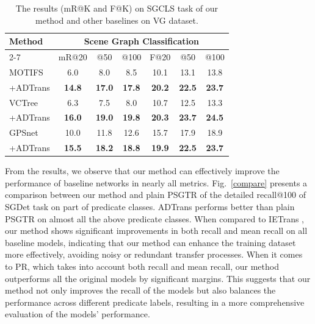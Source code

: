 \documentclass[letterpaper]{article} %
\begin{document}
\begin{table}[]
\tabcolsep=0.1cm

\begin{tabular}{l|cccccc}
\hline
\multirow{2}{*}{Method} & \multicolumn{6}{c}{Scene Graph Classification}                                                                     \\ \cline{2-7} 
                        & mR@20         & @50         & \multicolumn{1}{c|}{@100}        & F@20          & @50          & @100         \\ \hline
MOTIFS                  & 6.0           & 8.0           & \multicolumn{1}{c|}{8.5}           & 10.1          & 13.1          & 13.8          \\
\quad+ADTrans                & \textbf{14.8} & \textbf{17.0} & \multicolumn{1}{c|}{\textbf{17.8}} & \textbf{20.2} & \textbf{22.5} & \textbf{23.7} \\ \hline
VCTree                  & 6.3           & 7.5           & \multicolumn{1}{c|}{8.0}           & 10.7          & 12.5          & 13.3          \\
\quad+ADTrans                & \textbf{16.0} & \textbf{19.0} & \multicolumn{1}{c|}{\textbf{19.8}} & \textbf{20.3} & \textbf{23.7} & \textbf{24.5} \\ \hline
GPSnet                  & 10.0          & 11.8          & \multicolumn{1}{c|}{12.6}          & 15.7          & 17.9          & 18.9          \\
\quad+ADTrans                & \textbf{15.5} & \textbf{18.2} & \multicolumn{1}{c|}{\textbf{18.8}} & \textbf{19.9} & \textbf{22.5} & \textbf{23.7} \\ \hline
\end{tabular}
\caption{The results (mR@K and F@K) on SGCLS task of our method and other baselines on VG dataset.}
\label{sgcls}
\end{table}

 From the results, we observe that our method can effectively improve the performance of baseline networks in nearly all metrics. Fig.~\ref{compare} presents a comparison between our method and plain PSGTR of the detailed recall@100 of SGDet task on part of predicate classes. ADTrans performs better than plain PSGTR on almost all the above predicate classes. When compared to IETrans \cite{zhang2022fine}, our method shows significant improvements in both recall and mean recall on all baseline models, indicating that our method can enhance the training dataset more effectively, avoiding noisy or redundant transfer processes. When it comes to PR, which takes into account both recall and mean recall, our method outperforms all the original models by significant margins. This suggests that our method not only improves the recall of the models but also balances the performance across different predicate labels, resulting in a more comprehensive evaluation of the models' performance.
\end{document}
